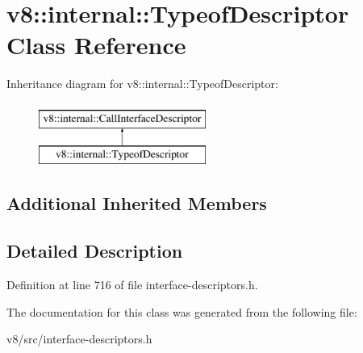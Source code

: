 \hypertarget{classv8_1_1internal_1_1TypeofDescriptor}{}\section{v8\+:\+:internal\+:\+:Typeof\+Descriptor Class Reference}
\label{classv8_1_1internal_1_1TypeofDescriptor}
Inheritance diagram for v8\+:\+:internal\+:\+:Typeof\+Descriptor\+:\begin{figure}[H]
\begin{center}
\leavevmode
\includegraphics[height=2.000000cm]{classv8_1_1internal_1_1TypeofDescriptor}
\end{center}
\end{figure}
\subsection*{Additional Inherited Members}


\subsection{Detailed Description}


Definition at line 716 of file interface-\/descriptors.\+h.



The documentation for this class was generated from the following file\+:\begin{DoxyCompactItemize}
\item 
v8/src/interface-\/descriptors.\+h\end{DoxyCompactItemize}
